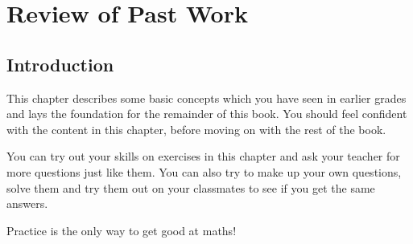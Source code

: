          \chapter{Review of Past Work}
    \setcounter{figure}{1}\setcounter{subfigure}{1}\label{m38346}
    \section{Introduction}
            \nopagebreak
      \label{m38346*id171138}This chapter describes some basic concepts which you have seen in earlier grades and lays the foundation for the remainder of this book. You should feel confident with the content in this chapter, before moving on with the rest of the book.\par 
      \label{m38346*id171143}You can try out your skills on exercises in this chapter and ask your teacher for more questions just like them. You can also try to make up your own questions, solve them and try them out on your classmates to see if you get the same answers.\par 
      \label{m38346*id171149}Practice is the only way to get good at maths!\par 

